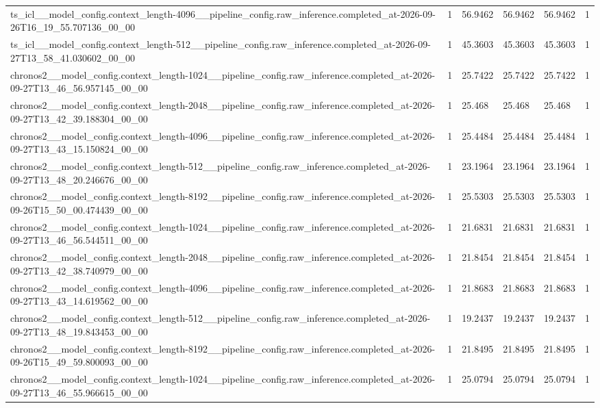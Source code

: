 \begin{tabular}{llllll}
ts\_icl\_\_model\_config.context\_length-4096\_\_pipeline\_config.raw\_inference.completed\_at-2026-09-26T16\_19\_55.707136\_00\_00 & 1 & 56.9462 & 56.9462 & 56.9462 & 1 \\
ts\_icl\_\_model\_config.context\_length-512\_\_pipeline\_config.raw\_inference.completed\_at-2026-09-27T13\_58\_41.030602\_00\_00 & 1 & 45.3603 & 45.3603 & 45.3603 & 1 \\
chronos2\_\_model\_config.context\_length-1024\_\_pipeline\_config.raw\_inference.completed\_at-2026-09-27T13\_46\_56.957145\_00\_00 & 1 & 25.7422 & 25.7422 & 25.7422 & 1 \\
chronos2\_\_model\_config.context\_length-2048\_\_pipeline\_config.raw\_inference.completed\_at-2026-09-27T13\_42\_39.188304\_00\_00 & 1 & 25.468 & 25.468 & 25.468 & 1 \\
chronos2\_\_model\_config.context\_length-4096\_\_pipeline\_config.raw\_inference.completed\_at-2026-09-27T13\_43\_15.150824\_00\_00 & 1 & 25.4484 & 25.4484 & 25.4484 & 1 \\
chronos2\_\_model\_config.context\_length-512\_\_pipeline\_config.raw\_inference.completed\_at-2026-09-27T13\_48\_20.246676\_00\_00 & 1 & 23.1964 & 23.1964 & 23.1964 & 1 \\
chronos2\_\_model\_config.context\_length-8192\_\_pipeline\_config.raw\_inference.completed\_at-2026-09-26T15\_50\_00.474439\_00\_00 & 1 & 25.5303 & 25.5303 & 25.5303 & 1 \\
chronos2\_\_model\_config.context\_length-1024\_\_pipeline\_config.raw\_inference.completed\_at-2026-09-27T13\_46\_56.544511\_00\_00 & 1 & 21.6831 & 21.6831 & 21.6831 & 1 \\
chronos2\_\_model\_config.context\_length-2048\_\_pipeline\_config.raw\_inference.completed\_at-2026-09-27T13\_42\_38.740979\_00\_00 & 1 & 21.8454 & 21.8454 & 21.8454 & 1 \\
chronos2\_\_model\_config.context\_length-4096\_\_pipeline\_config.raw\_inference.completed\_at-2026-09-27T13\_43\_14.619562\_00\_00 & 1 & 21.8683 & 21.8683 & 21.8683 & 1 \\
chronos2\_\_model\_config.context\_length-512\_\_pipeline\_config.raw\_inference.completed\_at-2026-09-27T13\_48\_19.843453\_00\_00 & 1 & 19.2437 & 19.2437 & 19.2437 & 1 \\
chronos2\_\_model\_config.context\_length-8192\_\_pipeline\_config.raw\_inference.completed\_at-2026-09-26T15\_49\_59.800093\_00\_00 & 1 & 21.8495 & 21.8495 & 21.8495 & 1 \\
chronos2\_\_model\_config.context\_length-1024\_\_pipeline\_config.raw\_inference.completed\_at-2026-09-27T13\_46\_55.966615\_00\_00 & 1 & 25.0794 & 25.0794 & 25.0794 & 1 \\

\end{tabular}
